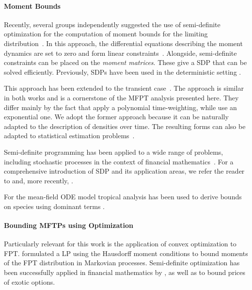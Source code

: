\paragraph{Moment Bounds} Recently, several groups independently suggested the use of semi-definite
optimization for the computation of moment bounds for the limiting
distribution~\parencite{ghusinga2017exact,dowdy2018bounds,kuntz2017rigorous,sakurai2017convex}.
In this approach, the differential equations describing the moment dynamics are
set to zero and form linear constraints~\parencite{backenkohler2018moment}. Alongside, semi-definite constraints can
be placed on the \emph{moment matrices}. These give a \acf{SDP}
that can be solved efficiently.
Previously, \acp{SDP} have been used in the deterministic setting \parencite{hasenauer2009guaranteed}.

This approach has been extended to the transient
case~\parencite{dowdy2018dynamic,sakurai2019bounding,holtorf2021tighter}.
The approach is similar in both works and is a cornerstone of the \ac{MFPT} analysis
presented here.
They differ mainly by the fact that \citet{sakurai2019bounding} apply a polynomial
time-weighting, while \citet{dowdy2018dynamic} use an
exponential one. We adopt the former approach because it
can be naturally adapted to the description of densities over time.
The resulting forms can also be adapted to statistical estimation
problems~\parencite{backenkohler2019control}.

Semi-definite programming has been applied to a wide range of problems,
including stochastic processes in the context of financial
mathematics~\parencite{lasserre2006pricing,kashima2009polynomial}.
For a comprehensive introduction of \ac{SDP} and its application areas, we refer
the reader to \citet{parrilo2003semidefinite} and, more recently,
\citet{lasserre2010moments}.

For the mean-field \ac{ODE} model tropical analysis has been used to derive bounds on species using dominant terms \parencite{beica2020tropical}.

\paragraph{Bounding MFTPs using Optimization}
Particularly relevant for this work is the application of convex optimization to
\ac{FPT}\@.
\citet{helmes2001computing} formulated a \ac{LP} using the
Hausdorff moment conditions \parencite{hausdorff} to bound moments of the
\ac{FPT} distribution in Markovian processes.
Semi-definite optimization has been successfully applied in financial
mathematics by \citet{kashima2009polynomial}, as well as
\citet{lasserre2006pricing} to bound prices of exotic options.


